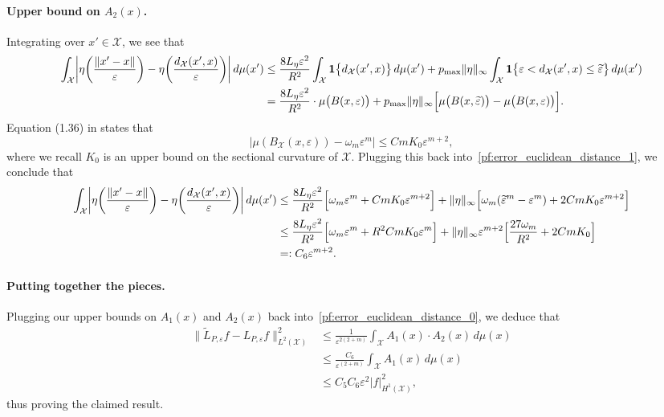 \documentclass[aos]{imsart}
\theoremstyle{plain}
\theoremstyle{definition}
\theoremstyle{remark}
\newcommand{\wt}[1]{\widetilde{#1}}
\newcommand{\mc}[1]{\mathcal{#1}}
\newcommand{\1}{\mathbf{1}}
\begin{document}
\paragraph{Upper bound on $A_2(x)$.}
Integrating over $x' \in \mc{X}$, we see that
\begin{align}
\int_{\mc{X}} \biggl|\eta\biggl(\frac{\|x' - x\|}{\varepsilon}\biggr) - \eta\biggl(\frac{d_{\mc{X}}(x',x)}{\varepsilon}\biggr)\biggr| \,d\mu(x') & \leq \frac{8L_{\eta}\varepsilon^2}{R^2} \int_{\mc{X}} \1\bigl\{d_{\mc{X}}(x',x)\bigr\} \,d\mu(x') + p_{\max}\|\eta\|_{\infty} \int_{\mc{X}} \1\bigl\{ \varepsilon < d_{\mc{X}}(x',x) \leq \wt{\varepsilon} \bigr\} \,d\mu(x') \nonumber \\
& = \frac{8L_{\eta}\varepsilon^2}{R^2} \cdot \mu\bigl(B(x,\varepsilon)\bigr) +  p_{\max}\|\eta\|_{\infty} \Bigl[\mu\bigl(B(x,\wt{\varepsilon})\bigr) - \mu\bigl(B(x,\varepsilon)\bigr) \Bigr]. \label{pf:error_euclidean_distance_1}
\end{align}
Equation (1.36) in \cite{trillos2019} states that
\begin{equation*}
\bigl|\mu(B_\mc{X}(x,\varepsilon))  - \omega_m \varepsilon^m\bigr|  \leq CmK_0\varepsilon^{m + 2},
\end{equation*}
where we recall $K_0$ is an upper bound on the sectional curvature of $\mc{X}$. Plugging this back into~\eqref{pf:error_euclidean_distance_1}, we conclude that
\begin{align*}
\int_{\mc{X}} \biggl|\eta\biggl(\frac{\|x' - x\|}{\varepsilon}\biggr) - \eta\biggl(\frac{d_{\mc{X}}(x',x)}{\varepsilon}\biggr)\biggr| \,d\mu(x') & \leq  \frac{8L_{\eta}\varepsilon^2}{R^2}\Bigl[\omega_m\varepsilon^{m} + CmK_0\varepsilon^{m + 2}\Bigr] + \|\eta\|_{\infty} \Bigl[\omega_m(\wt{\varepsilon}^m - {\varepsilon}^m) + 2CmK_0\varepsilon^{m + 2}\Bigr] \\
& \leq \frac{8L_{\eta}\varepsilon^2}{R^2}\Bigl[\omega_m\varepsilon^{m} + R^2CmK_0\varepsilon^{m}\Bigr] + \|\eta\|_{\infty} \varepsilon^{m + 2}\Bigl[\frac{27\omega_m}{R^2} + 2CmK_0\Bigr] \\
& =: C_6 \varepsilon^{m + 2}.
\end{align*}

\paragraph{Putting together the pieces.}
Plugging our upper bounds on $A_1(x)$ and $A_2(x)$ back into~\eqref{pf:error_euclidean_distance_0}, we deduce that
\begin{align*}
\|\wt{L}_{P,\varepsilon}f - L_{P,\varepsilon}f\|_{L^2(\mc{X})}^2 & \leq \frac{1}{\varepsilon^{2(2 + m)}} \int_{\mc{X}} A_1(x) \cdot A_2(x) \,d\mu(x) \\
& \leq \frac{C_6}{\varepsilon^{(2 + m)}} \int_{\mc{X}} A_1(x) \,d\mu(x) \\
& \leq C_5 C_6 \varepsilon^2 |f|_{H^1(\mc{X})}^2,
\end{align*}
thus proving the claimed result.
\end{document}
